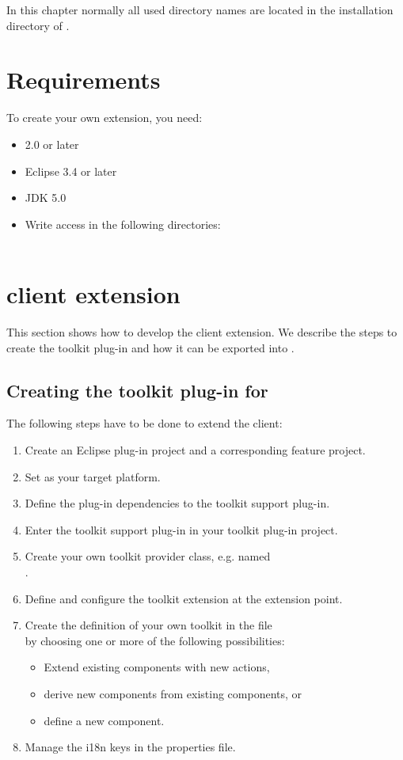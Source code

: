 In this chapter normally all used directory names are located in the
installation directory of \app{}.

\section{Requirements}
To create your own \app{} extension, you need:
\begin{itemize}
\item \app{} 2.0 or later
\item Eclipse 3.4 or later
\item JDK 5.0
\item Write access in the following directories:\\
\\
\end{itemize}

\section{\app{} client extension}
\label{clientExtension}

This section shows how to develop the \app{} client extension. We describe the
steps to create the toolkit plug-in and how it can be exported into \app{}.

\subsection{Creating the toolkit plug-in for \app{}}

The following steps have to be done to extend the \app{} client:
\begin{enumerate}
 \item Create an Eclipse plug-in project and a corresponding feature project.
 \item Set  as your
 target platform.
 \item Define the plug-in dependencies to the toolkit support plug-in.
 \item Enter the toolkit support plug-in in your toolkit plug-in project.
 \item Create your own toolkit provider class, e.g. named\\
 .
 \item Define and configure the toolkit extension at the extension point.
 \item Create the definition of your own toolkit in the file\\
  by choosing one or more of the following
 possibilities:
 \begin{itemize}
  \item Extend existing \app{} components with new actions,
  \item derive new components from existing \app{} components, or
  \item define a new component.
 \end{itemize}
 \item Manage the i18n keys in the properties file.
\end{enumerate}

